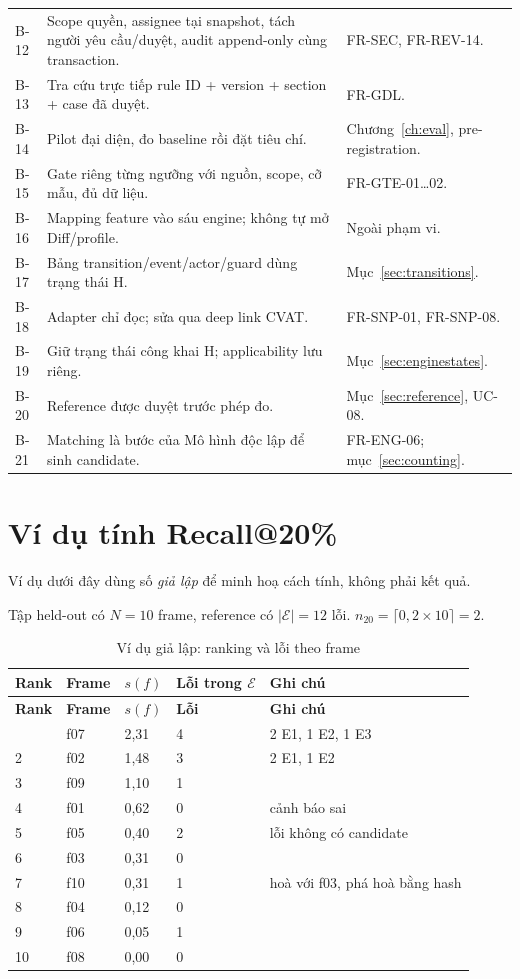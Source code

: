 \begin{xltabular}{\linewidth}{@{}L{1.1cm}L{4.6cm}Y@{}}
B-12 & Scope quyền, assignee tại snapshot, tách người yêu cầu/duyệt, audit append-only cùng transaction. & FR-SEC, FR-REV-14.\\
B-13 & Tra cứu trực tiếp rule ID + version + section + case đã duyệt. & FR-GDL.\\
B-14 & Pilot đại diện, đo baseline rồi đặt tiêu chí. & Chương~\ref{ch:eval}, pre-registration.\\
B-15 & Gate riêng từng ngưỡng với nguồn, scope, cỡ mẫu, đủ dữ liệu. & FR-GTE-01…02.\\
B-16 & Mapping feature vào sáu engine; không tự mở Diff/profile. & Ngoài phạm vi.\\
B-17 & Bảng transition/event/actor/guard dùng trạng thái H. & Mục~\ref{sec:transitions}.\\
B-18 & Adapter chỉ đọc; sửa qua deep link CVAT. & FR-SNP-01, FR-SNP-08.\\
B-19 & Giữ trạng thái công khai H; applicability lưu riêng. & Mục~\ref{sec:enginestates}.\\
B-20 & Reference được duyệt trước phép đo. & Mục~\ref{sec:reference}, UC-08.\\
B-21 & Matching là bước của Mô hình độc lập để sinh candidate. & FR-ENG-06; mục~\ref{sec:counting}.\\
\end{xltabular}

\chapter{Ví dụ tính Recall@20\%}
\label{app:example}
Ví dụ dưới đây dùng số \emph{giả lập} để minh hoạ cách tính, không phải kết quả.

Tập held-out có \(N = 10\) frame, reference có \(|\mathcal{E}| = 12\) lỗi.
\(n_{20} = \lceil 0{,}2 \times 10 \rceil = 2\).

\begin{xltabular}{\linewidth}{@{}C{1.4cm}C{1.6cm}C{1.6cm}C{2cm}Y@{}}
\caption{Ví dụ giả lập: ranking và lỗi theo frame}\label{tab:example}\\
\toprule
\textbf{Rank} & \textbf{Frame} & \(s(f)\) & \textbf{Lỗi trong \(\mathcal{E}\)} & \textbf{Ghi chú}\\
\midrule
\endfirsthead
\toprule \textbf{Rank} & \textbf{Frame} & \(s(f)\) & \textbf{Lỗi} & \textbf{Ghi chú}\\ \midrule
\endhead
\bottomrule
{} & f07 & 2{,}31 & 4 & 2 E1, 1 E2, 1 E3\\
2 & f02 & 1{,}48 & 3 & 2 E1, 1 E2\\
3 & f09 & 1{,}10 & 1 & \\
4 & f01 & 0{,}62 & 0 & cảnh báo sai\\
5 & f05 & 0{,}40 & 2 & lỗi không có candidate\\
6 & f03 & 0{,}31 & 0 & \\
7 & f10 & 0{,}31 & 1 & hoà với f03, phá hoà bằng hash\\
8 & f04 & 0{,}12 & 0 & \\
9 & f06 & 0{,}05 & 1 & \\
10 & f08 & 0{,}00 & 0 & \\
\end{xltabular}

